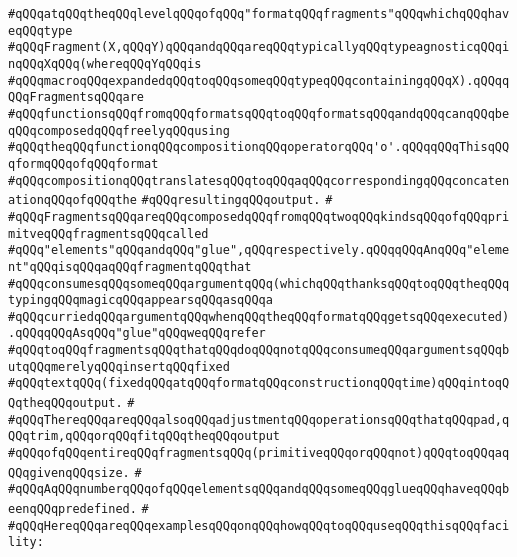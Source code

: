 \verb|#qQQqatqQQqtheqQQqlevelqQQqofqQQq"formatqQQqfragments"qQQqwhichqQQqhaveqQQqtype|\newline
\verb|#qQQqFragment(X,qQQqY)qQQqandqQQqareqQQqtypicallyqQQqtypeagnosticqQQqinqQQqXqQQq(whereqQQqYqQQqis|\newline
\verb|#qQQqmacroqQQqexpandedqQQqtoqQQqsomeqQQqtypeqQQqcontainingqQQqX).qQQqqQQqFragmentsqQQqare|\newline
\verb|#qQQqfunctionsqQQqfromqQQqformatsqQQqtoqQQqformatsqQQqandqQQqcanqQQqbeqQQqcomposedqQQqfreelyqQQqusing|\newline
\verb|#qQQqtheqQQqfunctionqQQqcompositionqQQqoperatorqQQq'o'.qQQqqQQqThisqQQqformqQQqofqQQqformat|\newline
\verb|#qQQqcompositionqQQqtranslatesqQQqtoqQQqaqQQqcorrespondingqQQqconcatenationqQQqofqQQqthe|\newline
\verb|#qQQqresultingqQQqoutput.|\newline
\verb|#|\newline
\verb|#qQQqFragmentsqQQqareqQQqcomposedqQQqfromqQQqtwoqQQqkindsqQQqofqQQqprimitveqQQqfragmentsqQQqcalled|\newline
\verb|#qQQq"elements"qQQqandqQQq"glue",qQQqrespectively.qQQqqQQqAnqQQq"element"qQQqisqQQqaqQQqfragmentqQQqthat|\newline
\verb|#qQQqconsumesqQQqsomeqQQqargumentqQQq(whichqQQqthanksqQQqtoqQQqtheqQQqtypingqQQqmagicqQQqappearsqQQqasqQQqa|\newline
\verb|#qQQqcurriedqQQqargumentqQQqwhenqQQqtheqQQqformatqQQqgetsqQQqexecuted).qQQqqQQqAsqQQq"glue"qQQqweqQQqrefer|\newline
\verb|#qQQqtoqQQqfragmentsqQQqthatqQQqdoqQQqnotqQQqconsumeqQQqargumentsqQQqbutqQQqmerelyqQQqinsertqQQqfixed|\newline
\verb|#qQQqtextqQQq(fixedqQQqatqQQqformatqQQqconstructionqQQqtime)qQQqintoqQQqtheqQQqoutput.|\newline
\verb|#|\newline
\verb|#qQQqThereqQQqareqQQqalsoqQQqadjustmentqQQqoperationsqQQqthatqQQqpad,qQQqtrim,qQQqorqQQqfitqQQqtheqQQqoutput|\newline
\verb|#qQQqofqQQqentireqQQqfragmentsqQQq(primitiveqQQqorqQQqnot)qQQqtoqQQqaqQQqgivenqQQqsize.|\newline
\verb|#|\newline
\verb|#qQQqAqQQqnumberqQQqofqQQqelementsqQQqandqQQqsomeqQQqglueqQQqhaveqQQqbeenqQQqpredefined.|\newline
\verb|#|\newline
\verb|#qQQqHereqQQqareqQQqexamplesqQQqonqQQqhowqQQqtoqQQquseqQQqthisqQQqfacility:|\newline
